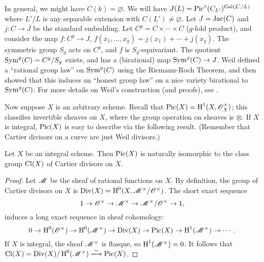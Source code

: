 In general, we might have $C(k)=\varnothing$. We will have 
$J(L)=\operatorname{Pic}^\circ(C_{L'})^{\operatorname{Gal}(L'/L)}$ where $L'/L$ is any separable extension 
with $C(L')\ne\varnothing$. Let $J=\operatorname{Jac}(C)$ and $j:C\to J$ be the standard 
embedding. Let $C^g=C\times\cdots\times C$ ($g$-fold product), and consider the 
map $f:C^g\to J$, $f(x_1,\dotsc,x_g)=j(x_1)+\cdots+j(x_g)$. The symmetric 
group $S_g$ acts on $C^g$, and $f$ is $S_g$-equivariant. The quotient 
$\operatorname{Sym}^g(C) = C^g/S_g$ exists, and has a (birational) map 
$\operatorname{Sym}^g(C)\to J$. Weil defined a ``rational group law'' on 
$\operatorname{Sym}^g(C)$ using the Riemann-Roch Theorem, and then showed that this 
induces an ``honest group law'' on a nice variety birational to 
$\operatorname{Sym}^g(C)$. For more details on Weil's construction (and proofs), 
see \cite[III.7]{mi-av}. 

Now suppose $X$ is an arbitrary scheme. Recall that 
$\operatorname{Pic}(X)=\operatorname{H}^1(X,\mathscr{O}_X^\times)$; this classifies invertible sheaves on 
$X$, where the group operation on sheaves is $\otimes$. If $X$ is integral, 
$\operatorname{Pic}(X)$ is easy to describe via the following result. (Remember that 
Cartier divisors on a curve are just Weil divisors.) 

\begin{theorem}
Let $X$ be an integral scheme. Then $\operatorname{Pic}(X)$ is naturally isomorphic to the 
class group $\operatorname{Cl}(X)$ of Cartier divisors on $X$. 
\end{theorem}
\begin{proof}
Let $\mathscr{M}$ be the sheaf of rational functions on $X$. By definition, the group 
of Cartier divisors on $X$ is $\operatorname{Div}(X) = \operatorname{H}^0(X,\mathscr{M}^\times/\mathscr{O}^\times)$. 
The short exact sequence 
\[
  1 \to \mathscr{O}^\times \to \mathscr{M}^\times\to \mathscr{M}^\times/\mathscr{O}^\times \to 1 , 
\]
induces a long exact sequence in sheaf cohomology:
\[
  0 \to \operatorname{H}^0(\mathscr{O}^\times) \to \operatorname{H}^0(\mathscr{M}^\times) \to \operatorname{Div}(X) \to \operatorname{Pic}(X) \to \operatorname{H}^1(\mathscr{M}^\times) \to \cdots .
\]
If $X$ is integral, the sheaf $\mathscr{M}^\times$ is flasque, so $\operatorname{H}^1(\mathscr{M}^\times)=0$. 
It follows that 
$\class(X)=\divisor(X)/\h^0(\sM^\times) \isomorphism \picard(X)$. 
\end{proof}

